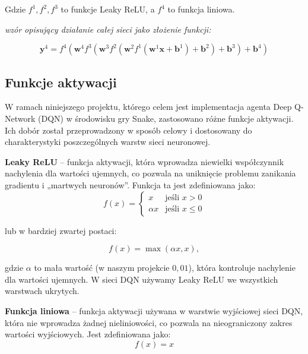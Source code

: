 \documentclass[a4paper,12pt]{article}
\begin{document}
Gdzie \(f^{1}, f^{2}, f^{3}\) to funkcje Leaky ReLU, a \(f^{4}\) to funkcja liniowa.

\textit{wzór opisujący działanie całej sieci jako złożenie funkcji:}

\begin{equation}
\mathbf{y}^{4} = f^{4}\left( \mathbf{w}^{4} f^{3} \left( \mathbf{w}^{3} f^{2} \left( \mathbf{w}^{2} f^{1}(\mathbf{w}^{1} \mathbf{x} + \mathbf{b}^{1}) + \mathbf{b}^{2} \right) + \mathbf{b}^{3} \right) + \mathbf{b}^{4} \right)
\end{equation}

\subsection{Funkcje aktywacji}

W ramach niniejszego projektu, którego celem jest implementacja agenta Deep Q-Network (DQN) w środowisku gry Snake, zastosowano różne funkcje aktywacji. Ich dobór został przeprowadzony w sposób celowy i dostosowany do charakterystyki poszczególnych warstw sieci neuronowej.

\textbf{Leaky ReLU} – funkcja aktywacji, która wprowadza niewielki współczynnik nachylenia dla wartości ujemnych, co pozwala na uniknięcie problemu zanikania gradientu i „martwych neuronów”. Funkcja ta jest zdefiniowana jako:
\begin{equation}
f(x) = \begin{cases}
x & \text{jeśli } x > 0 \\
\alpha x & \text{jeśli } x \leq 0
\end{cases}
\end{equation}

lub w bardziej zwartej postaci:

\begin{equation}
f(x) = \max(\alpha x, x),
\end{equation}

gdzie \(\alpha\) to mała wartość (w naszym projekcie \(0{,}01\)), która kontroluje nachylenie dla wartości ujemnych. W sieci DQN używamy Leaky ReLU we wszystkich warstwach ukrytych.

\medskip

\textbf{Funkcja liniowa} – funkcja aktywacji używana w warstwie wyjściowej sieci DQN, która nie wprowadza żadnej nieliniowości, co pozwala na nieograniczony zakres wartości wyjściowych. Jest zdefiniowana jako:
\begin{equation}
f(x) = x
\end{equation}
\end{document}
